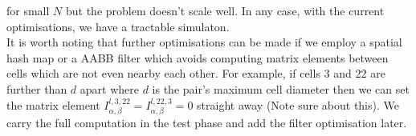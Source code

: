 for small $N$ but the problem doesn't scale well. In any case, with the current optimisations, we have a tractable simulaton.
\\
It is worth noting that further optimisations can be made if we employ a spatial hash map or a AABB filter which avoids computing matrix elements 
between cells which are not even nearby each other. For example, if cells $3$ and $22$ are further than $d$ apart where $d$ is the pair's maximum cell diameter
then we can set the matrix element $I_{\alpha, \beta}^{l,3,22} =I_{\alpha, \beta}^{l,22,3} = 0$ straight away (Note sure about this). We carry the full computation 
in the test phase and add the filter optimisation later.
\\
\\
